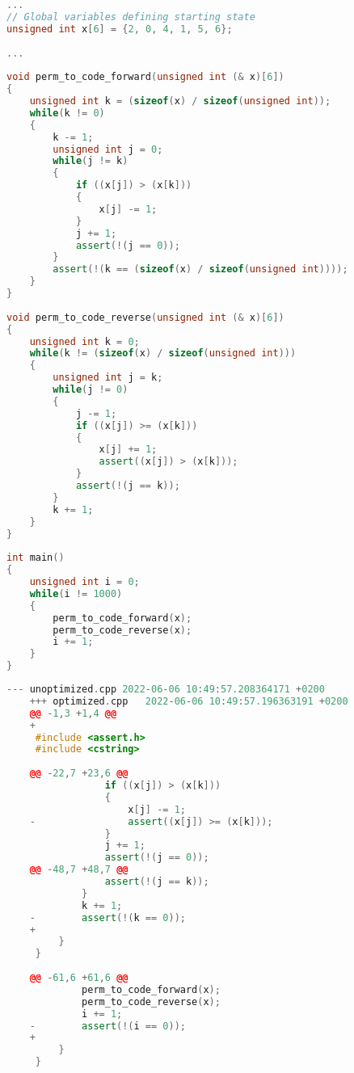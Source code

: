 \begin{varwidth}[t]{0.45\textwidth}
\begin{lstlisting}[language=C++, label={lst:optRLE}, caption={Optimized Perm to code program.}]
...
// Global variables defining starting state
unsigned int x[6] = {2, 0, 4, 1, 5, 6};
 
...
 
void perm_to_code_forward(unsigned int (& x)[6])
{
    unsigned int k = (sizeof(x) / sizeof(unsigned int));
    while(k != 0)
    {
        k -= 1;
        unsigned int j = 0;
        while(j != k)
        {
            if ((x[j]) > (x[k]))
            {
                x[j] -= 1;
            }
            j += 1;
            assert(!(j == 0));
        }
        assert(!(k == (sizeof(x) / sizeof(unsigned int))));
    }
}
 
void perm_to_code_reverse(unsigned int (& x)[6])
{
    unsigned int k = 0;
    while(k != (sizeof(x) / sizeof(unsigned int)))
    {
        unsigned int j = k;
        while(j != 0)
        {
            j -= 1;
            if ((x[j]) >= (x[k]))
            {
                x[j] += 1;
                assert((x[j]) > (x[k]));
            }
            assert(!(j == k));
        }
        k += 1;
    }
}
 
int main()
{
    unsigned int i = 0;
    while(i != 1000)
    {
        perm_to_code_forward(x);
        perm_to_code_reverse(x);
        i += 1;
    }
}
\end{lstlisting}
\end{varwidth}
\hspace{4em}
\begin{varwidth}[t]{0.45\textwidth}
\begin{lstlisting}[language=C++, label={lst:RLE}, caption={Output from \texttt{diff -u} bwetween
    the optimized \texttt{perm-to-code.japa} program vs. the unoptimized.}]
    --- unoptimized.cpp	2022-06-06 10:49:57.208364171 +0200
    +++ optimized.cpp	2022-06-06 10:49:57.196363191 +0200
    @@ -1,3 +1,4 @@
    +
     #include <assert.h>
     #include <cstring>
      
    @@ -22,7 +23,6 @@
                 if ((x[j]) > (x[k]))
                 {
                     x[j] -= 1;
    -                assert((x[j]) >= (x[k]));
                 }
                 j += 1;
                 assert(!(j == 0));
    @@ -48,7 +48,7 @@
                 assert(!(j == k));
             }
             k += 1;
    -        assert(!(k == 0));
    +        
         }
     }
      
    @@ -61,6 +61,6 @@
             perm_to_code_forward(x);
             perm_to_code_reverse(x);
             i += 1;
    -        assert(!(i == 0));
    +        
         }
     }
    
\end{lstlisting}
\end{varwidth}